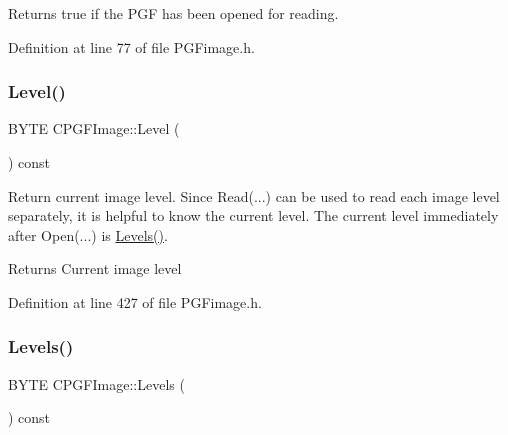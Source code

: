 Returns true if the P\+GF has been opened for reading. 



Definition at line 77 of file P\+G\+Fimage.\+h.


\begin{DoxyCode}{0}

\end{DoxyCode}
\mbox{\label{classCPGFImage_a4619eb255afd03dabea2b0afbe6e0d94}} 
\subsubsection{\texorpdfstring{Level()}{Level()}}
{\footnotesize\ttfamily B\+Y\+TE C\+P\+G\+F\+Image\+::\+Level (\begin{DoxyParamCaption}{ }\end{DoxyParamCaption}) const\hspace{0.3cm}{\ttfamily [inline]}}

Return current image level. Since Read(...) can be used to read each image level separately, it is helpful to know the current level. The current level immediately after Open(...) is \mbox{\hyperlink{classCPGFImage_ab3678d05c031dc4cbf5451e7f4f6bdf3}{Levels()}}. \begin{DoxyReturn}{Returns}
Current image level 
\end{DoxyReturn}


Definition at line 427 of file P\+G\+Fimage.\+h.


\begin{DoxyCode}{0}

\end{DoxyCode}
\mbox{\label{classCPGFImage_ab3678d05c031dc4cbf5451e7f4f6bdf3}} 
\subsubsection{\texorpdfstring{Levels()}{Levels()}}
{\footnotesize\ttfamily B\+Y\+TE C\+P\+G\+F\+Image\+::\+Levels (\begin{DoxyParamCaption}{ }\end{DoxyParamCaption}) const\hspace{0.3cm}{\ttfamily [inline]}}

